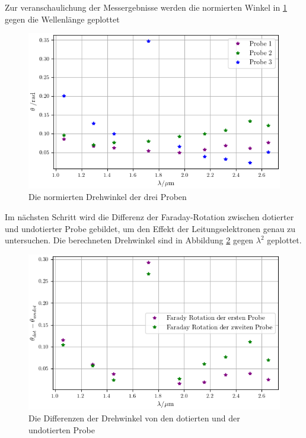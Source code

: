 Zur veranschaulichung der Messergebnisse werden die normierten Winkel in \ref{fig:2} gegen die Wellenlänge geplottet
\begin{figure}
    \centering
    \includegraphics[width=\textwidth]{Bilder/Probe1-3.png}
    \caption{Die normierten Drehwinkel der drei Proben}
    \label{fig:2}
\end{figure}
 
Im nächsten Schritt wird die Differenz der Faraday-Rotation zwischen dotierter und undotierter Probe
gebildet, um den Effekt der Leitungselektronen genau zu untersuchen. Die berechneten Drehwinkel sind in 
Abbildung \ref{fig:differenzen}  gegen $\lambda^2$ geplottet.

\begin{figure}
    \centering
    \includegraphics[width=\textwidth]{Bilder/differenzen.png}
    \caption{Die Differenzen der Drehwinkel von den dotierten und der undotierten Probe}
    \label{fig:differenzen}
\end{figure}


